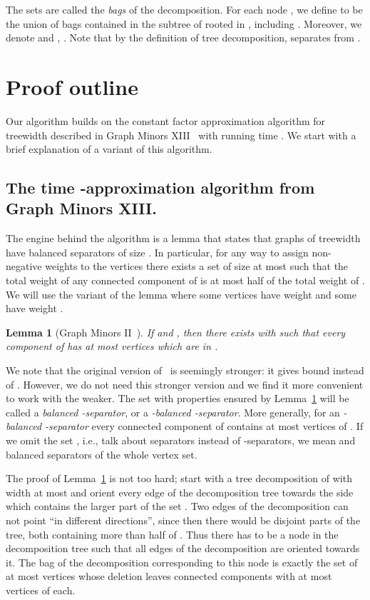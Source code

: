 \documentclass[a4paper,11pt]{article}
\newtheorem{lemma}{Lemma}[section]
\theoremstyle{definition}
\theoremstyle{remark}
\begin{document}
The sets  are called the \emph{bags} of the decomposition.  For
each node , we define  to be the union of bags contained
in the subtree of  rooted in , including .  Moreover, we
denote  and , .
Note that by the definition of tree decomposition,  separates
 from .


\section{Proof outline}
\label{sec:outline}
Our algorithm builds on the constant factor approximation algorithm
for treewidth described in Graph Minors XIII~\cite{RobertsonS13} with
running time .  We start with a brief explanation of a
variant of this algorithm.

\subsection{The  time -approximation algorithm from
  Graph Minors XIII.}\label{sec:nSquareAppx}
The engine behind the algorithm is a lemma that states that graphs of
treewidth  have balanced separators of size .
In particular, for any way to assign non-negative weights to the
vertices there exists a set  of size at most  such that the
total weight of any connected component of  is at most
half of the total weight of .  We will use the variant of the lemma
where some vertices have weight  and some have weight .

\begin{lemma}[Graph Minors II~\cite{RobertsonS2}]
  \label{lemma:halfhalf}
  If  and , then there exists  with
   such that every component of  has at
  most  vertices which are in .
\end{lemma}

We note that the original version of~\cite{RobertsonS2} is seemingly
stronger: it gives bound  instead of
.  However, we do not need this stronger version and
we find it more convenient to work with the weaker.  The set  with
properties ensured by Lemma~\ref{lemma:halfhalf} will be called a
{\emph{balanced -separator}}, or a {\emph{-balanced
    -separator}}.  More generally, for an {\emph{-balanced
    -separator}}  every connected component of 
contains at most  vertices of .  If we omit the set ,
i.e., talk about separators instead of -separators, we mean
 and balanced separators of the whole vertex set.

The proof of Lemma~\ref{lemma:halfhalf} is not too hard; start with a
tree decomposition of  with width at most  and orient every edge
of the decomposition tree towards the side which contains the larger
part of the set .  Two edges of the decomposition can not point
``in different directions'', since then there would be disjoint parts
of the tree, both containing more than half of .  Thus there has to
be a node in the decomposition tree such that all edges of the
decomposition are oriented towards it.  The bag of the decomposition
corresponding to this node is exactly the set  of at most 
vertices whose deletion leaves connected components with at most
 vertices of  each.
\end{document}
